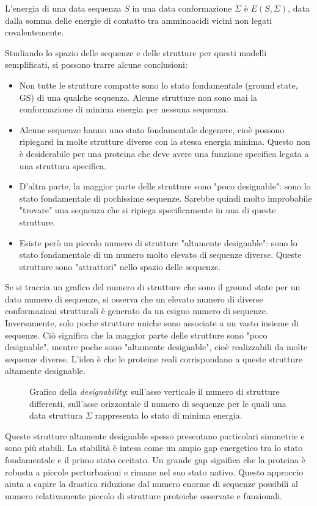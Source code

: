 L'energia di una data sequenza $S$ in una data conformazione $\Sigma$ è $E(S, \Sigma)$, data dalla somma delle energie di contatto tra amminoacidi vicini non legati covalentemente.

Studiando lo spazio delle sequenze e delle strutture per questi modelli semplificati, si possono trarre alcune conclusioni:
\begin{itemize}
    \item Non tutte le strutture compatte sono lo stato fondamentale (ground state, GS) di una qualche sequenza. Alcune strutture non sono mai la conformazione di minima energia per nessuna sequenza.
    \item Alcune sequenze hanno uno stato fondamentale degenere, cioè possono ripiegarsi in molte strutture diverse con la stessa energia minima. Questo non è desiderabile per una proteina che deve avere una funzione specifica legata a una struttura specifica.
    \item D'altra parte, la maggior parte delle strutture sono "poco designable": sono lo stato fondamentale di pochissime sequenze. Sarebbe quindi molto improbabile "trovare" una sequenza che si ripiega specificamente in una di queste strutture.
    \item Esiste però un piccolo numero di strutture "altamente designable": sono lo stato fondamentale di un numero molto elevato di sequenze diverse. Queste strutture sono "attrattori" nello spazio delle sequenze.
\end{itemize}

Se si traccia un grafico del numero di strutture che sono il ground state per un dato numero di sequenze, si osserva che un elevato numero di diverse conformazioni strutturali è generato da un esiguo numero di sequenze. Inversamente, solo poche strutture uniche sono associate a un vasto insieme di sequenze. Ciò significa che la maggior parte delle strutture sono "poco designable", mentre poche sono "altamente designable", cioè realizzabili da molte sequenze diverse.
L'idea è che le proteine reali corrispondano a queste strutture altamente designable.

\begin{figure}[h!]
\centering
\caption{Grafico della \textit{designability}: sull'asse verticale il numero di strutture differenti, sull'asse orizzontale il numero di sequenze per le quali una data struttura $\Sigma$ rappresenta lo stato di minima energia.}
\label{fig:ch23_2}
\end{figure}

Queste strutture altamente designable spesso presentano particolari simmetrie e sono più stabili. La stabilità è intesa come un ampio gap energetico tra lo stato fondamentale e il primo stato eccitato. Un grande gap significa che la proteina è robusta a piccole perturbazioni e rimane nel suo stato nativo.
Questo approccio aiuta a capire la drastica riduzione dal numero enorme di sequenze possibili al numero relativamente piccolo di strutture proteiche osservate e funzionali.
